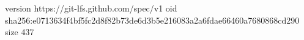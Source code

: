 version https://git-lfs.github.com/spec/v1
oid sha256:e0713634f4bf5fc2d8f82b73de6d3b5e216083a2a6fdae66460a7680868cd290
size 437
